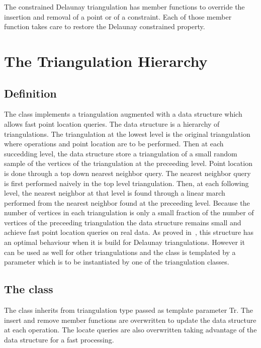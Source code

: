 The constrained Delaunay triangulation
has member functions to override the 
insertion and removal of a point or of a constraint.
Each of those member function takes care
to  restore
 the Delaunay constrained
property.

\section{The Triangulation Hierarchy}

\subsection{Definition}
The class 
 implements a triangulation augmented with
a data structure which allows fast point location
queries.
The
data structure  is a hierarchy 
of triangulations. The triangulation at the lowest level is
 the original triangulation where operations and point location are to 
be performed.
Then at each succedding level, the data structure
store a triangulation of a small random sample of the vertices
of the triangulation at the preceeding level. Point location
is done through a top down nearest neighbor query.
The nearest neighbor query is first
performed naively in the top level triangulation.
Then, at each following level, the nearest neighbor at that level
is found through a linear march performed from
the nearest neighbor found at the preceeding level.
Because the number of vertices in each triangulation is only a small
fraction
of the number of vertices of the preceeding triangulation 
the data structure remains small and achieve fast point location 
queries  on real
data. As proved in~\cite{d-iirdt-98}, this structure has an optimal behaviour
when it is build for Delaunay triangulations.
However it can be used as well for other triangulations
and the 
 class  is templated by a parameter
which is to be instantiated by one of the \cgal triangulation
classes.

\subsection{The class \protect {}}
The class  inherits from
triangulation type passed as template parameter Tr. 
The insert and remove member functions
are  overwritten to update the data structure at each operation.
The locate queries are also overwritten taking advantage of the data
structure for a fast processing.

